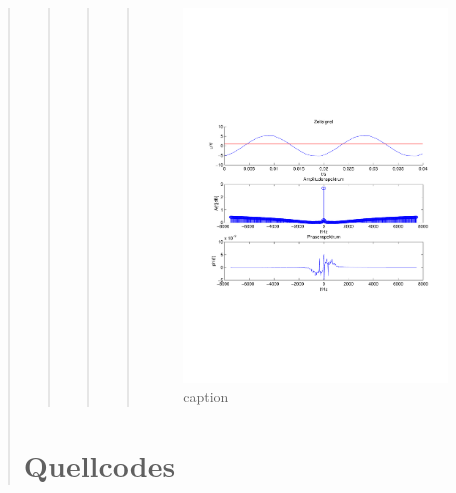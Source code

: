 \begin{quote}
\begin{quote}
\begin{quote}
\begin{quote}
            \begin{figure}[H]
            \centering
                \includegraphics[scale=0.7, trim = 1.5cm 7cm 1.5cm 8.5cm, clip]{./Bilder/OberwellenmessungspektrumTHD00332.pdf}
                    \caption{caption}
            \end{figure}
    

    	\end{quote} %
    
    \end{quote}  %
			
\end{quote}%
\section{Quellcodes}
\begin{quote}
	

\end{quote}
\end{quote}
